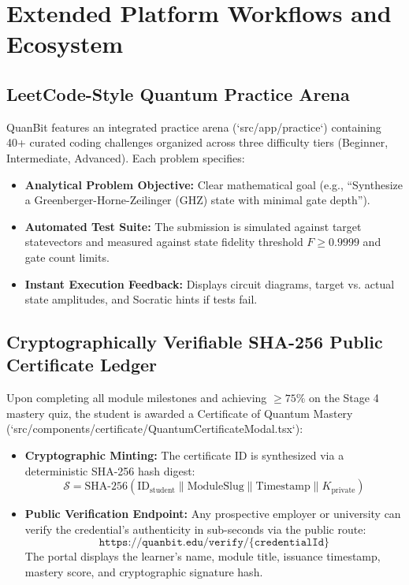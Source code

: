 \documentclass[11pt, a4paper]{article}
\begin{document}
\newpage

\section{Extended Platform Workflows and Ecosystem}

\subsection{LeetCode-Style Quantum Practice Arena}
QuanBit features an integrated practice arena (`src/app/practice`) containing 40+ curated coding challenges organized across three difficulty tiers (Beginner, Intermediate, Advanced). Each problem specifies:
\begin{itemize}
	\item \textbf{Analytical Problem Objective:} Clear mathematical goal (e.g., ``Synthesize a Greenberger-Horne-Zeilinger (GHZ) state with minimal gate depth'').
	\item \textbf{Automated Test Suite:} The submission is simulated against target statevectors and measured against state fidelity threshold $F \ge 0.9999$ and gate count limits.
	\item \textbf{Instant Execution Feedback:} Displays circuit diagrams, target vs. actual state amplitudes, and Socratic hints if tests fail.
\end{itemize}

\subsection{Cryptographically Verifiable SHA-256 Public Certificate Ledger}
Upon completing all module milestones and achieving $\ge 75\%$ on the Stage 4 mastery quiz, the student is awarded a Certificate of Quantum Mastery (`src/components/certificate/QuantumCertificateModal.tsx`):
\begin{itemize}
	\item \textbf{Cryptographic Minting:} The certificate ID is synthesized via a deterministic SHA-256 hash digest:
	$$\mathcal{S} = \text{SHA-256}(\text{ID}_{\text{student}} \parallel \text{ModuleSlug} \parallel \text{Timestamp} \parallel K_{\text{private}})$$
	\item \textbf{Public Verification Endpoint:} Any prospective employer or university can verify the credential's authenticity in sub-seconds via the public route:
	$$\texttt{https://quanbit.edu/verify/\{credentialId\}}$$
	The portal displays the learner's name, module title, issuance timestamp, mastery score, and cryptographic signature hash.
\end{itemize}
\end{document}
